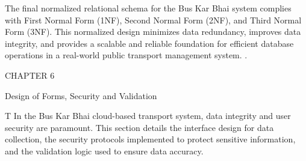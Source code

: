 The final normalized relational schema for the Bus Kar Bhai system complies with First Normal Form (1NF), Second Normal Form (2NF), and Third Normal Form (3NF). This normalized design minimizes data redundancy, improves data integrity, and provides a scalable and reliable foundation for efficient database operations in a real-world public transport management system.
.



CHAPTER 6

Design of Forms, Security and Validation

T In the Bus Kar Bhai cloud-based transport system, data integrity and user security are paramount. This section details the interface design for data collection, the security protocols implemented to protect sensitive information, and the validation logic used to ensure data accuracy.

